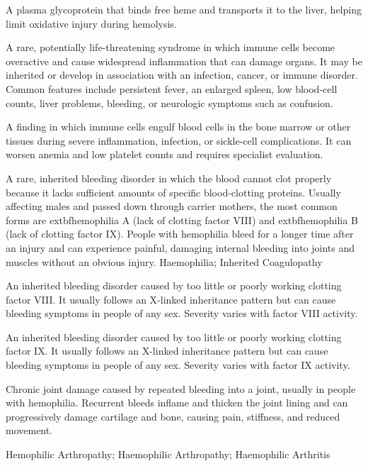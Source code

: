  A plasma glycoprotein that binds free heme and transports it to the liver, helping limit oxidative injury during hemolysis.

 A rare, potentially life-threatening syndrome in which immune cells become overactive and cause widespread inflammation that can damage organs. It may be inherited or develop in association with an infection, cancer, or immune disorder. Common features include persistent fever, an enlarged spleen, low blood-cell counts, liver problems, bleeding, or neurologic symptoms such as confusion.

 A finding in which immune cells engulf blood cells in the bone marrow or other tissues during severe inflammation, infection, or sickle-cell complications. It can worsen anemia and low platelet counts and requires specialist evaluation.

 A rare, inherited bleeding disorder in which the blood cannot clot properly because it lacks sufficient amounts of specific blood-clotting proteins. Usually affecting males and passed down through carrier mothers, the most common forms are  extbf{hemophilia A} (lack of clotting factor VIII) and  extbf{hemophilia B} (lack of clotting factor IX). People with hemophilia bleed for a longer time after an injury and can experience painful, damaging internal bleeding into joints and muscles without an obvious injury.
\synonyms
Haemophilia; Inherited Coagulopathy

 An inherited bleeding disorder caused by too little or poorly working clotting factor VIII. It usually follows an X-linked inheritance pattern but can cause bleeding symptoms in people of any sex. Severity varies with factor VIII activity.

 An inherited bleeding disorder caused by too little or poorly working clotting factor IX. It usually follows an X-linked inheritance pattern but can cause bleeding symptoms in people of any sex. Severity varies with factor IX activity.

 Chronic joint damage caused by repeated bleeding into a joint, usually in people with hemophilia. Recurrent bleeds inflame and thicken the joint lining and can progressively damage cartilage and bone, causing pain, stiffness, and reduced movement.

\synonyms
Hemophilic Arthropathy; Haemophilic Arthropathy; Haemophilic Arthritis

